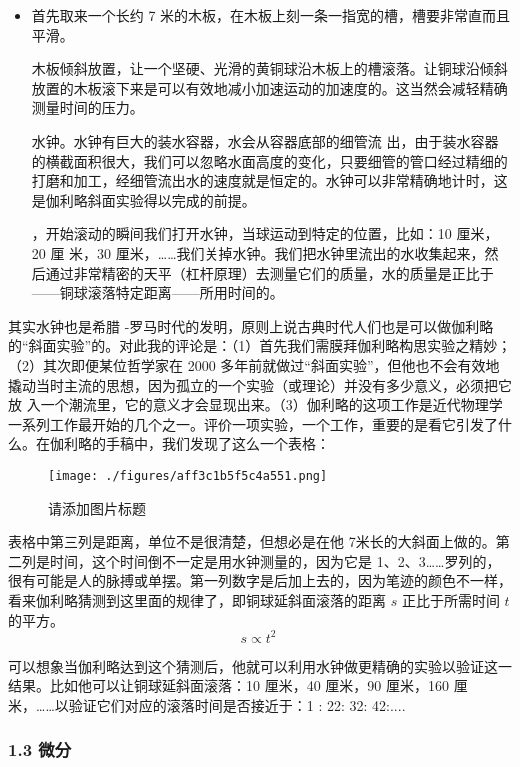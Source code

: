 \begin{itemize}
\item 首先取来⼀个长约 7 米的⽊板，在⽊板上刻⼀条⼀指宽的槽，槽要非常直⽽且平滑。

⽊板倾斜放置，让⼀个坚硬、光滑的黄铜球沿⽊板上的槽滚落。让铜球沿倾斜放置的⽊板滚下来是可以有效地减小加速运动的加速度的。这当然会减轻精确测量时间的压⼒。

⽔钟。⽔钟有巨⼤的装⽔容器，⽔会从容器底部的细管流
出，由于装⽔容器的横截面积很⼤，我们可以忽略⽔面⾼度的变化，只要细管的管⼝经过精细的打磨和加⼯，经细管流出⽔的速度就是恒定的。⽔钟可以非常精确地计时，这是伽利略斜面实验得以完成的前提。

，开始滚动的瞬间我们打开⽔钟，当球运动到特定的位置，比如：10 厘米，20 厘
米，30 厘米，……我们关掉⽔钟。我们把⽔钟里流出的⽔收集起来，然后通过非常精密的天平（杠杆原理）去测量它们的质量，⽔的质量是正比于——铜球滚落特定距离——所用时间的。
\end{itemize}

其实⽔钟也是希腊 -罗马时代的发明，原则上说古典时代⼈们也是可以做伽利略的“斜面实验”的。对此我的评论是：（1）首先我们需膜拜伽利略构思实验之精妙；（2）其次即便某位哲学家在 2000 多年前就做过“斜面实验”，但他也不会有效地撬动当时主流的思想，因为孤立的⼀个实验（或理论）并没有多少意义，必须把它放
⼊⼀个潮流里，它的意义才会显现出来。（3）伽利略的这项⼯作是近代物理学⼀系列⼯作最开始的⼏个之⼀。评价⼀项实验，⼀个⼯作，重要的是看它引发了什么。在伽利略的⼿稿中，我们发现了这么⼀个表格：

\begin{figure}[ht]
\centering
\texttt{[image: ./figures/aff3c1b5f5c4a551.png]}
\caption{请添加图片标题} \label{fig_AtomId_11}
\end{figure}

表格中第三列是距离，单位不是很清楚，但想必是在他 7米长的⼤斜面上做的。第⼆列是时间，这个时间倒不⼀定是用⽔钟测量的，因为它是 1、2、3……罗列的，很有可能是⼈的脉搏或单摆。第⼀列数字是后加上去的，因为笔迹的颜⾊不⼀样，看来伽利略猜测到这里面的规律了，即铜球延斜面滚落的距离 $s$ 正比于所需时间 $t$ 的平⽅。
\begin{equation}
s \propto t^2~
\end{equation}

可以想象当伽利略达到这个猜测后，他就可以利用⽔钟做更精确的实验以验证这⼀结果。比如他可以让铜球延斜面滚落：10 厘米，40 厘米，90 厘米，160 厘米，……以验证它们对应的滚落时间是否接近于：1 : 22: 32: 42:....

\subsubsection{1.3 微分}

